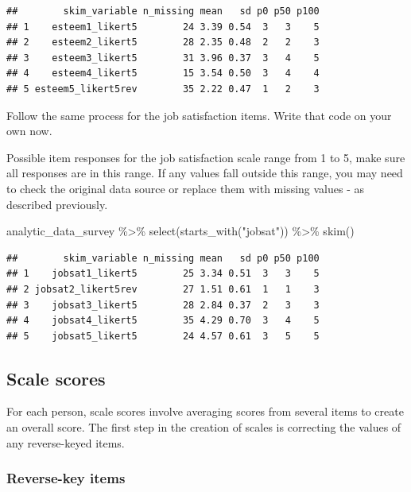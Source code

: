 \documentclass[
]{krantz}
\makeatletter
\newenvironment{Shaded}{\begin{snugshade}}{\end{snugshade}}
\newcommand{\FunctionTok}[1]{\textcolor[rgb]{0,0,0}{#1}}
\newcommand{\NormalTok}[1]{#1}
\newcommand{\SpecialCharTok}[1]{\textcolor[rgb]{0,0,0}{#1}}
\newcommand{\StringTok}[1]{\textcolor[rgb]{0.5,0.5,0.5}{#1}}
\newenvironment{kframe}{%
\medskip{}
\setlength{\fboxsep}{.8em}
 \def\at@end@of@kframe{}%
 \ifinner\ifhmode%
  \def\at@end@of@kframe{\end{minipage}}%
  \begin{minipage}{\columnwidth}%
 \fi\fi%
 \def\FrameCommand##1{\hskip\@totalleftmargin \hskip-\fboxsep
 \colorbox{shadecolor}{##1}\hskip-\fboxsep
     \hskip-\linewidth \hskip-\@totalleftmargin \hskip\columnwidth}%
 \MakeFramed {\advance\hsize-\width
   \@totalleftmargin\z@ \linewidth\hsize
   \@setminipage}}%
 {\par\unskip\endMakeFramed%
 \at@end@of@kframe}
\renewenvironment{Shaded}{\begin{kframe}}{\end{kframe}}
\makeatother
\begin{document}
\begin{verbatim}
##        skim_variable n_missing mean   sd p0 p50 p100
## 1    esteem1_likert5        24 3.39 0.54  3   3    5
## 2    esteem2_likert5        28 2.35 0.48  2   2    3
## 3    esteem3_likert5        31 3.96 0.37  3   4    5
## 4    esteem4_likert5        15 3.54 0.50  3   4    4
## 5 esteem5_likert5rev        35 2.22 0.47  1   2    3
\end{verbatim}

Follow the same process for the job satisfaction items. Write that code on your own now.

Possible item responses for the job satisfaction scale range from 1 to 5, make sure all responses are in this range. If any values fall outside this range, you may need to check the original data source or replace them with missing values - as described previously.

\begin{Shaded}
\begin{Highlighting}[]
\NormalTok{analytic\_data\_survey }\SpecialCharTok{\%\textgreater{}\%}
  \FunctionTok{select}\NormalTok{(}\FunctionTok{starts\_with}\NormalTok{(}\StringTok{"jobsat"}\NormalTok{)) }\SpecialCharTok{\%\textgreater{}\%}
  \FunctionTok{skim}\NormalTok{()}
\end{Highlighting}
\end{Shaded}

\begin{verbatim}
##        skim_variable n_missing mean   sd p0 p50 p100
## 1    jobsat1_likert5        25 3.34 0.51  3   3    5
## 2 jobsat2_likert5rev        27 1.51 0.61  1   1    3
## 3    jobsat3_likert5        28 2.84 0.37  2   3    3
## 4    jobsat4_likert5        35 4.29 0.70  3   4    5
## 5    jobsat5_likert5        24 4.57 0.61  3   5    5
\end{verbatim}

\hypertarget{scale-scores}{%
\subsection{Scale scores}\label{scale-scores}}

For each person, scale scores involve averaging scores from several items to create an overall score. The first step in the creation of scales is correcting the values of any reverse-keyed items.

\hypertarget{reverse-key-items}{%
\subsubsection{Reverse-key items}\label{reverse-key-items}}
\end{document}
